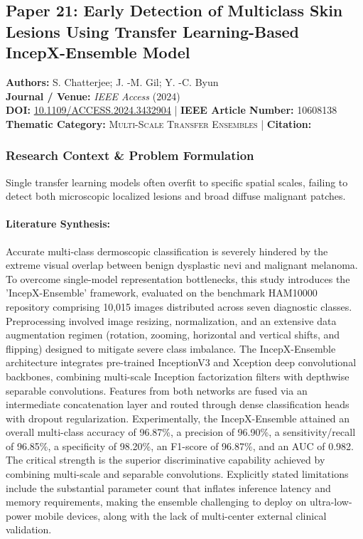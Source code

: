 \subsection{Paper 21: Early Detection of Multiclass Skin Lesions Using Transfer Learning-Based IncepX-Ensemble Model}
\label{sec:paper_21}

\begin{tcolorbox}[colback=gray!5!white,colframe=gray!75!black,title=\textbf{Metadata \& Citation Summary}]
\textbf{Authors:} S. Chatterjee; J. -M. Gil; Y. -C. Byun \\
\textbf{Journal / Venue:} \textit{IEEE Access} (2024) \\
\textbf{DOI:} \href{https://doi.org/10.1109/ACCESS.2024.3432904}{10.1109/ACCESS.2024.3432904} \quad | \quad \textbf{IEEE Article Number:} 10608138 \\
\textbf{Thematic Category:} \textsc{Multi-Scale Transfer Ensembles} \quad | \quad \textbf{Citation:} \cite{10608138}
\end{tcolorbox}

\subsubsection*{Research Context \& Problem Formulation}
Single transfer learning models often overfit to specific spatial scales, failing to detect both microscopic localized lesions and broad diffuse malignant patches.

\paragraph{Literature Synthesis:} Accurate multi-class dermoscopic classification is severely hindered by the extreme visual overlap between benign dysplastic nevi and malignant melanoma. To overcome single-model representation bottlenecks, this study introduces the 'IncepX-Ensemble' framework, evaluated on the benchmark HAM10000 repository comprising 10,015 images distributed across seven diagnostic classes. Preprocessing involved image resizing, normalization, and an extensive data augmentation regimen (rotation, zooming, horizontal and vertical shifts, and flipping) designed to mitigate severe class imbalance. The IncepX-Ensemble architecture integrates pre-trained InceptionV3 and Xception deep convolutional backbones, combining multi-scale Inception factorization filters with depthwise separable convolutions. Features from both networks are fused via an intermediate concatenation layer and routed through dense classification heads with dropout regularization. Experimentally, the IncepX-Ensemble attained an overall multi-class accuracy of 96.87\%, a precision of 96.90\%, a sensitivity/recall of 96.85\%, a specificity of 98.20\%, an F1-score of 96.87\%, and an AUC of 0.982. The critical strength is the superior discriminative capability achieved by combining multi-scale and separable convolutions. Explicitly stated limitations include the substantial parameter count that inflates inference latency and memory requirements, making the ensemble challenging to deploy on ultra-low-power mobile devices, along with the lack of multi-center external clinical validation.

